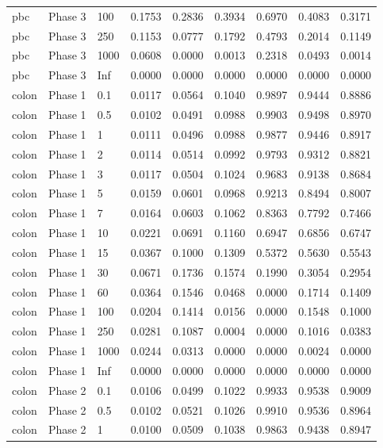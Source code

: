 \begin{tabular}{lllllllll}
  pbc & Phase 3 & 100 & 0.1753 & 0.2836 & 0.3934 & 0.6970 & 0.4083 & 0.3171 \\ 
  pbc & Phase 3 & 250 & 0.1153 & 0.0777 & 0.1792 & 0.4793 & 0.2014 & 0.1149 \\ 
  pbc & Phase 3 & 1000 & 0.0608 & 0.0000 & 0.0013 & 0.2318 & 0.0493 & 0.0014 \\ 
  pbc & Phase 3 & Inf & 0.0000 & 0.0000 & 0.0000 & 0.0000 & 0.0000 & 0.0000 \\ 
  colon & Phase 1 & 0.1 & 0.0117 & 0.0564 & 0.1040 & 0.9897 & 0.9444 & 0.8886 \\ 
  colon & Phase 1 & 0.5 & 0.0102 & 0.0491 & 0.0988 & 0.9903 & 0.9498 & 0.8970 \\ 
  colon & Phase 1 & 1 & 0.0111 & 0.0496 & 0.0988 & 0.9877 & 0.9446 & 0.8917 \\ 
  colon & Phase 1 & 2 & 0.0114 & 0.0514 & 0.0992 & 0.9793 & 0.9312 & 0.8821 \\ 
  colon & Phase 1 & 3 & 0.0117 & 0.0504 & 0.1024 & 0.9683 & 0.9138 & 0.8684 \\ 
  colon & Phase 1 & 5 & 0.0159 & 0.0601 & 0.0968 & 0.9213 & 0.8494 & 0.8007 \\ 
  colon & Phase 1 & 7 & 0.0164 & 0.0603 & 0.1062 & 0.8363 & 0.7792 & 0.7466 \\ 
  colon & Phase 1 & 10 & 0.0221 & 0.0691 & 0.1160 & 0.6947 & 0.6856 & 0.6747 \\ 
  colon & Phase 1 & 15 & 0.0367 & 0.1000 & 0.1309 & 0.5372 & 0.5630 & 0.5543 \\ 
  colon & Phase 1 & 30 & 0.0671 & 0.1736 & 0.1574 & 0.1990 & 0.3054 & 0.2954 \\ 
  colon & Phase 1 & 60 & 0.0364 & 0.1546 & 0.0468 & 0.0000 & 0.1714 & 0.1409 \\ 
  colon & Phase 1 & 100 & 0.0204 & 0.1414 & 0.0156 & 0.0000 & 0.1548 & 0.1000 \\ 
  colon & Phase 1 & 250 & 0.0281 & 0.1087 & 0.0004 & 0.0000 & 0.1016 & 0.0383 \\ 
  colon & Phase 1 & 1000 & 0.0244 & 0.0313 & 0.0000 & 0.0000 & 0.0024 & 0.0000 \\ 
  colon & Phase 1 & Inf & 0.0000 & 0.0000 & 0.0000 & 0.0000 & 0.0000 & 0.0000 \\ 
  colon & Phase 2 & 0.1 & 0.0106 & 0.0499 & 0.1022 & 0.9933 & 0.9538 & 0.9009 \\ 
  colon & Phase 2 & 0.5 & 0.0102 & 0.0521 & 0.1026 & 0.9910 & 0.9536 & 0.8964 \\ 
  colon & Phase 2 & 1 & 0.0100 & 0.0509 & 0.1038 & 0.9863 & 0.9438 & 0.8947 \\ 

\end{tabular}
